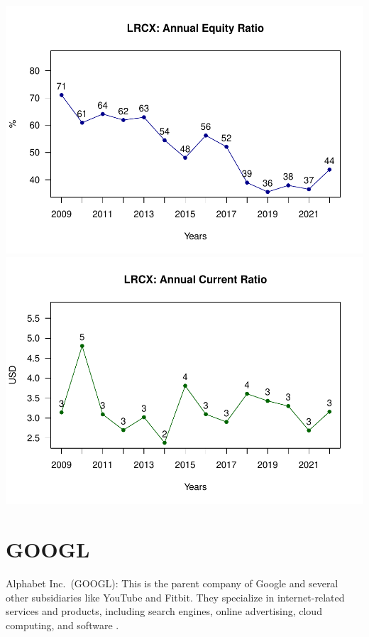 \documentclass[
]{book}
\begin{document}
\includegraphics{_main_files/figure-latex/unnamed-chunk-1-19.pdf}
\includegraphics{_main_files/figure-latex/unnamed-chunk-1-20.pdf}

\hypertarget{googl}{%
\section{GOOGL}\label{googl}}

Alphabet Inc.~(GOOGL): This is the parent company of Google and several other subsidiaries like YouTube and Fitbit. They specialize in internet-related services and products, including search engines, online advertising, cloud computing, and software .
\end{document}
